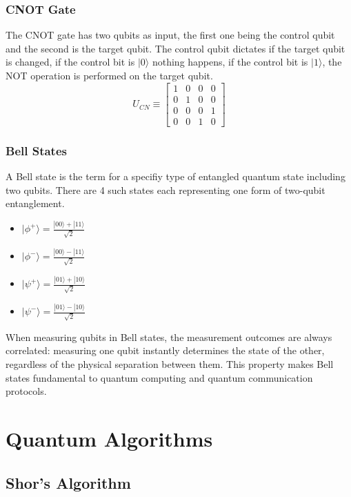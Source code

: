 \documentclass{report}
\begin{document}
\subsubsection{CNOT Gate}
The CNOT gate has two qubits as input, the first one being the control qubit and the second is the target qubit. The control qubit dictates if the target qubit is changed, if the control bit is \(|0\rangle\) nothing happens, if the control bit is \(|1\rangle\), the NOT operation is performed on the target qubit.
\[U_{CN} \equiv 
\begin{bmatrix}
    1 & 0 & 0 & 0 \\
    0 & 1 & 0 & 0 \\
    0 & 0 & 0 & 1 \\
    0 & 0 & 1 & 0 
\end{bmatrix}\]
\cite{microsoftBeginnersGuide}
\cite{quantuminspireCNOTGate}
\subsubsection{Bell States}
A Bell state is the term for a specifiy type of entangled quantum state including two qubits. There are 4 such states each representing one form of two-qubit entanglement.

\begin{itemize}
    \item \(|\phi^+\rangle=\frac{|00\rangle+|11\rangle}{\sqrt2}\)
    \item \(|\phi^-\rangle=\frac{|00\rangle-|11\rangle}{\sqrt2}\)
    \item \(|\psi^+\rangle=\frac{|01\rangle+|10\rangle}{\sqrt2}\)
    \item \(|\psi^-\rangle=\frac{|01\rangle-|10\rangle}{\sqrt2}\)
\end{itemize}

When measuring qubits in Bell states, the measurement outcomes are always correlated: measuring one qubit instantly determines the state of the other, regardless of the physical separation between them. This property makes Bell states fundamental to quantum computing and quantum communication protocols. 

\cite{queraWhatBell}

\cite{microsoftBeginnersGuide}


\section{Quantum Algorithms}


\subsection{Shor's Algorithm}
\end{document}
